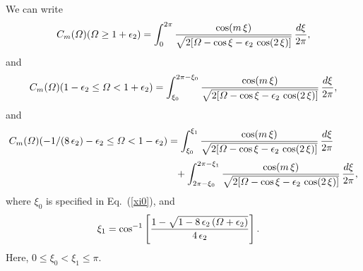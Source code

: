 \documentclass[12pt,prb,aps]{revtex4-1}
\begin{document}
We can write 
\begin{equation}
C_m({\mit\Omega})({\mit\Omega}\geq 1+\epsilon_2) = \int_0^{2\pi}
\frac{\cos(m\,\xi)}{\sqrt{2[{\mit\Omega}-\cos\xi-\epsilon_2\,\cos(2\,\xi)]}}\,\frac{d\xi}{2\pi},
\end{equation} 
and
\begin{equation}
C_m({\mit\Omega})(1-\epsilon_2\leq {\mit\Omega}< 1+\epsilon_2) = \int_{\xi_0}^{2\pi-\xi_0}
\frac{\cos(m\,\xi)}{\sqrt{2[{\mit\Omega}-\cos\xi-\epsilon_2\,\cos(2\,\xi)]}}\,\frac{d\xi}{2\pi},
\end{equation} 
and
\begin{align}
C_m({\mit\Omega})(-1/(8\,\epsilon_2)-\epsilon_2 \leq {\mit\Omega}< 1-\epsilon_2) &= \int_{\xi_0}^{\xi_1}
\frac{\cos(m\,\xi)}{\sqrt{2[{\mit\Omega}-\cos\xi-\epsilon_2\,\cos(2\,\xi)]}}\,\frac{d\xi}{2\pi}\nonumber\\[0.5ex]
&\phantom{=}+\int_{2\pi-\xi_0}^{2\pi-\xi_1}
\frac{\cos(m\,\xi)}{\sqrt{2[{\mit\Omega}-\cos\xi-\epsilon_2\,\cos(2\,\xi)]}}\,\frac{d\xi}{2\pi},
\end{align} 
where $\xi_0$ is specified in Eq.~(\ref{xi0}), and 
\begin{align}\label{xi1}
\xi_1 &=\cos^{-1}\left[\frac{1-\sqrt{1-8\,\epsilon_2\,({\mit\Omega}+\epsilon_2)}}{4\,\epsilon_2}\right].
\end{align}
Here, $0\leq \xi_0<\xi_1\leq \pi$. 
\end{document}
